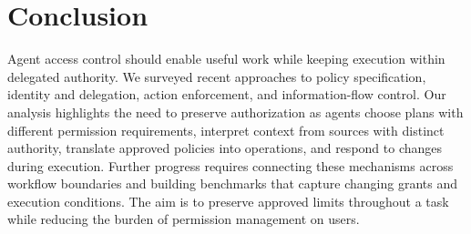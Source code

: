 \section{Conclusion}
Agent access control should enable useful work while keeping execution within delegated authority. We surveyed recent approaches to policy specification, identity and delegation, action enforcement, and information-flow control. Our analysis highlights the need to preserve authorization as agents choose plans with different permission requirements, interpret context from sources with distinct authority, translate approved policies into operations, and respond to changes during execution. Further progress requires connecting these mechanisms across workflow boundaries and building benchmarks that capture changing grants and execution conditions. The aim is to preserve approved limits throughout a task while reducing the burden of permission management on users.
